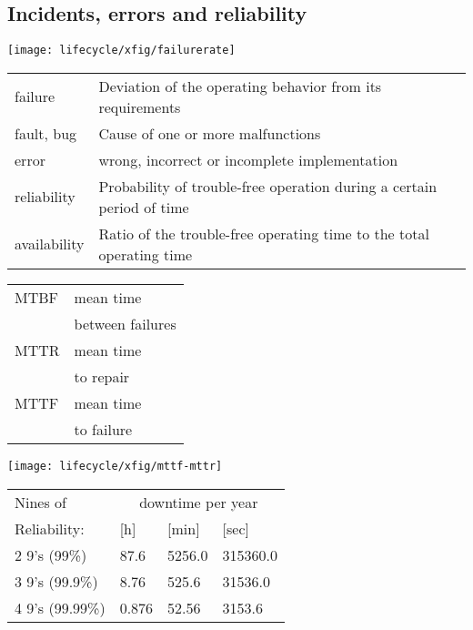 \subsection{Incidents, errors and reliability}
\texttt{[image: lifecycle/xfig/failurerate]}\\
\ifslides
{\footnotesize
\fi
\begin{tabularx}{\linewidth}{lX}
failure & Deviation of the operating behavior from its requirements \\
fault, bug & Cause of one or more malfunctions \\
error & wrong, incorrect or incomplete implementation \\
reliability & Probability of trouble-free operation during a certain period of time \\
availability & Ratio of the trouble-free operating time to the total operating time \\
\end{tabularx}
\ifslides
}
\fi
\begin{minipage}[t]{0.3\linewidth}
\small
\begin{tabular}{ll}
MTBF & mean time\\
     & between  failures\\
MTTR & mean time\\
     & to repair \\
MTTF & mean time\\
     & to failure\\
\end{tabular}

\end{minipage}
\hfill
\begin{minipage}{0.6\linewidth}
\texttt{[image: lifecycle/xfig/mttf-mttr]}

{\small
\begin{tabular}{llll}
Nines of     &            \multicolumn{3}{c}{downtime per year}\\
Reliability: &         [h]    &     [min]   &     [sec]\\
\hline
2 9's (99\%)     &  87.6    &   5256.0   &  315360.0 \\
3 9's (99.9\%)    &  8.76   &    525.6   &   31536.0 \\
4 9's (99.99\%)   &  0.876  &     52.56  &    3153.6 \\
%
\end{tabular}
}
\end{minipage}
%
\newpage

